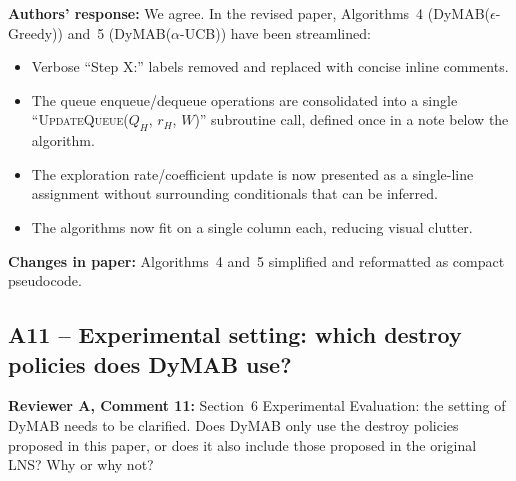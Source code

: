 \documentclass[review]{jair}
\begin{document}
\begin{authorbox}
\textbf{Authors' response:} We agree. In the revised paper, Algorithms~4 (DyMAB($\epsilon$-Greedy)) and~5 (DyMAB($\alpha$-UCB)) have been streamlined:
\begin{itemize}[leftmargin=2em]
  \item Verbose ``Step X:'' labels removed and replaced with concise inline comments.
  \item The queue enqueue/dequeue operations are consolidated into a single ``\textsc{UpdateQueue}($Q_H$, $r_H$, $W$)'' subroutine call, defined once in a note below the algorithm.
  \item The exploration rate/coefficient update is now presented as a single-line assignment without surrounding conditionals that can be inferred.
  \item The algorithms now fit on a single column each, reducing visual clutter.
\end{itemize}
\end{authorbox}

\begin{changebox}
\textbf{Changes in paper:} Algorithms~4 and~5 simplified and reformatted as compact pseudocode.
\end{changebox}

\subsection*{A11 -- Experimental setting: which destroy policies does DyMAB use?}

\begin{reviewerbox}
\textbf{Reviewer A, Comment 11:} Section~6 Experimental Evaluation: the setting of DyMAB needs to be clarified. Does DyMAB only use the destroy policies proposed in this paper, or does it also include those proposed in the original LNS? Why or why not?
\end{reviewerbox}
\end{document}
